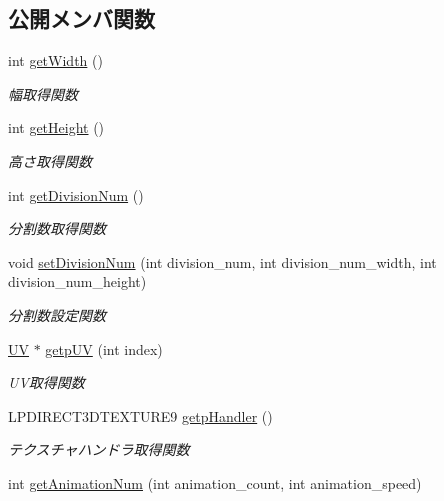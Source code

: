 \subsection*{公開メンバ関数}
\begin{DoxyCompactItemize}
\item 
int \mbox{\hyperlink{class_texture_object_a578484836fe30262396a8245d89adaad}{get\+Width}} ()
\begin{DoxyCompactList}\small\item\em 幅取得関数 \end{DoxyCompactList}\item 
int \mbox{\hyperlink{class_texture_object_a072347536b4d036b78ee132f61538f5d}{get\+Height}} ()
\begin{DoxyCompactList}\small\item\em 高さ取得関数 \end{DoxyCompactList}\item 
int \mbox{\hyperlink{class_texture_object_abac4508851ecec7162097729e4c04cc5}{get\+Division\+Num}} ()
\begin{DoxyCompactList}\small\item\em 分割数取得関数 \end{DoxyCompactList}\item 
void \mbox{\hyperlink{class_texture_object_a4522f4cdf2833f7829e12f40b112e1ae}{set\+Division\+Num}} (int division\+\_\+num, int division\+\_\+num\+\_\+width, int division\+\_\+num\+\_\+height)
\begin{DoxyCompactList}\small\item\em 分割数設定関数 \end{DoxyCompactList}\item 
\mbox{\hyperlink{class_texture_object_1_1_u_v}{UV}} $\ast$ \mbox{\hyperlink{class_texture_object_a9ccebedf94db3aeef0f3ccc28cc686b7}{getp\+UV}} (int index)
\begin{DoxyCompactList}\small\item\em U\+V取得関数 \end{DoxyCompactList}\item 
L\+P\+D\+I\+R\+E\+C\+T3\+D\+T\+E\+X\+T\+U\+R\+E9 \mbox{\hyperlink{class_texture_object_a5d6976d20349c77be424fb6a7cacabc8}{getp\+Handler}} ()
\begin{DoxyCompactList}\small\item\em テクスチャハンドラ取得関数 \end{DoxyCompactList}\item 
int \mbox{\hyperlink{class_texture_object_a1606085624ec1ac2d15fe2e12a92c8f2}{get\+Animation\+Num}} (int animation\+\_\+count, int animation\+\_\+speed)

\end{DoxyCompactItemize}
